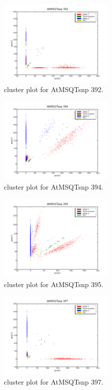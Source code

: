 \begin{figure}[H]
\includegraphics[width=0.5\textwidth]{figures/cluster_plot_AtMSQTsnp_392.png}
\caption{cluster plot for AtMSQTsnp 392.} \label{flAtMSQTsnp392}
\end{figure}

\begin{figure}[H]
\includegraphics[width=0.5\textwidth]{figures/cluster_plot_AtMSQTsnp_394.png}
\caption{cluster plot for AtMSQTsnp 394.} \label{flAtMSQTsnp394}
\end{figure}

\begin{figure}[H]
\includegraphics[width=0.5\textwidth]{figures/cluster_plot_AtMSQTsnp_395.png}
\caption{cluster plot for AtMSQTsnp 395.} \label{flAtMSQTsnp395}
\end{figure}

\begin{figure}[H]
\includegraphics[width=0.5\textwidth]{figures/cluster_plot_AtMSQTsnp_397.png}
\caption{cluster plot for AtMSQTsnp 397.} \label{flAtMSQTsnp397}
\end{figure}

